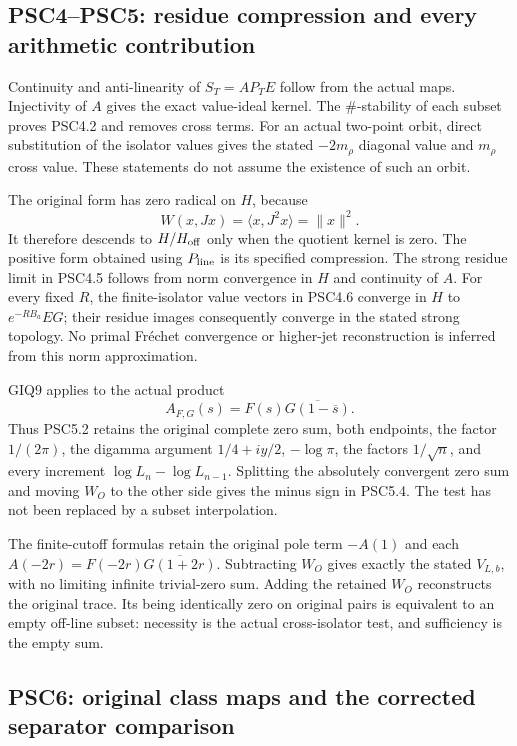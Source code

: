\subsection{PSC4--PSC5: residue compression and every arithmetic
contribution}\label{psc4psc5-residue-compression-and-every-arithmetic-contribution}

Continuity and anti-linearity of \(S_T=AP_TE\) follow from the actual
maps. Injectivity of \(A\) gives the exact value-ideal kernel. The
\(\#\)-stability of each subset proves PSC4.2 and removes cross terms.
For an actual two-point orbit, direct substitution of the isolator
values gives the stated \(-2m_\rho\) diagonal value and \(m_\rho\) cross
value. These statements do not assume the existence of such an orbit.

The original form has zero radical on \(H\), because \[
W(x,Jx)=\langle x,J^2x\rangle=\|x\|^2.
\] It therefore descends to \(H/H_{\rm off}\) only when the quotient
kernel is zero. The positive form obtained using \(P_{\rm line}\) is its
specified compression. The strong residue limit in PSC4.5 follows from
norm convergence in \(H\) and continuity of \(A\). For every fixed
\(R\), the finite-isolator value vectors in PSC4.6 converge in \(H\) to
\(e^{-RB_a}EG\); their residue images consequently converge in the
stated strong topology. No primal Fréchet convergence or higher-jet
reconstruction is inferred from this norm approximation.

GIQ9 applies to the actual product \[
A_{F,G}(s)=F(s)\overline{G(1-\overline s)}.
\] Thus PSC5.2 retains the original complete zero sum, both endpoints,
the factor \(1/(2\pi)\), the digamma argument \(1/4+iy/2\),
\(-\log\pi\), the factors \(1/\sqrt n\), and every increment
\(\log L_n-\log L_{n-1}\). Splitting the absolutely convergent zero sum
and moving \(W_O\) to the other side gives the minus sign in PSC5.4. The
test has not been replaced by a subset interpolation.

The finite-cutoff formulas retain the original pole term \(-A(1)\) and
each \(A(-2r)=F(-2r)\overline{G(1+2r)}\). Subtracting \(W_O\) gives
exactly the stated \(V_{L,b}\), with no limiting infinite trivial-zero
sum. Adding the retained \(W_O\) reconstructs the original trace. Its
being identically zero on original pairs is equivalent to an empty
off-line subset: necessity is the actual cross-isolator test, and
sufficiency is the empty sum.

\subsection{PSC6: original class maps and the corrected separator
comparison}\label{psc6-original-class-maps-and-the-corrected-separator-comparison}

